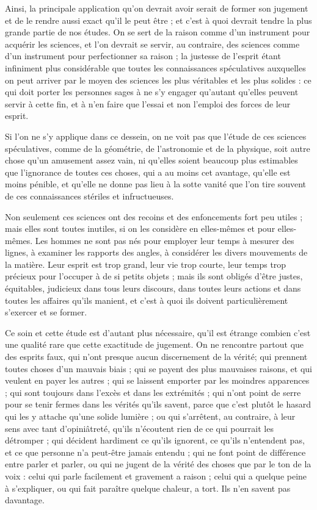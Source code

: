 Ainsi, la principale application qu'on devrait avoir serait de former son jugement et de le rendre aussi exact qu'il le peut être ; et c'est à quoi devrait tendre la plus grande partie de nos études. On se sert de la raison comme d'un instrument pour acquérir les sciences, et l'on devrait se servir, au contraire, des sciences comme d'un instrument pour perfectionner sa raison ; la justesse de l'esprit étant infiniment plus considérable que toutes les connaissances spéculatives auxquelles on peut arriver par le moyen des sciences les plus véritables et les plus solides : ce qui doit porter les personnes sages à ne s'y engager qu'autant qu'elles peuvent servir à cette fin, et à n'en faire que l'essai et non l'emploi des forces de leur esprit.

Si l'on ne s'y applique dans ce dessein, on ne voit pas que l'étude de ces sciences spéculatives, comme de la géométrie, de l'astronomie et de la physique, soit autre chose qu'un amusement assez vain, ni qu'elles soient beaucoup plus estimables que l'ignorance de toutes ces choses, qui a au moins cet avantage, qu'elle est moins pénible, et qu'elle ne donne pas lieu à la sotte vanité que l'on tire souvent de ces connaissances stériles et infructueuses.

Non seulement ces sciences ont des recoins et des enfoncements fort peu utiles ; mais elles sont toutes inutiles, si on les considère en elles-mêmes et pour elles-mêmes. Les hommes ne sont pas nés pour employer leur temps à mesurer des lignes, à examiner les rapports des angles, à considérer les divers mouvements de la matière. Leur esprit est trop grand, leur vie trop courte, leur temps trop précieux pour l'occuper à de si petits objets ; mais ils sont obligés d'être justes, équitables, judicieux dans tous leurs discours, dans toutes leurs actions et dans toutes les affaires qu'ils manient, et c'est à quoi ils doivent particulièrement s'exercer et se former.

Ce soin et cette étude est d'autant plus nécessaire, qu'il est étrange combien c'est une qualité rare que cette exactitude de jugement. On ne rencontre partout que des esprits faux, qui n'ont presque aucun discernement de la vérité; qui prennent toutes choses d'un mauvais biais ; qui se payent des plus mauvaises raisons, et qui veulent en payer les autres ; qui se laissent emporter par les moindres apparences ; qui sont toujours dans l'excès et dans les extrémités ; qui n'ont point de serre pour se tenir fermes dans les vérités qu'ils savent, parce que c'est plutôt le hasard qui les y attache qu'une solide lumière ; ou qui s'arrêtent, au contraire, à leur sens avec tant d'opiniâtreté, qu'ils n'écoutent rien de ce qui pourrait les détromper ; qui décident hardiment ce qu'ils ignorent, ce qu'ils n'entendent pas, et ce que personne n'a peut-être jamais entendu ; qui ne font point de différence entre parler et parler, ou qui ne jugent de la vérité des choses que par le ton de la voix : celui qui parle facilement et gravement a raison ; celui qui a quelque peine à s'expliquer, ou qui fait paraître quelque chaleur, a tort. Ils n'en savent pas davantage.


